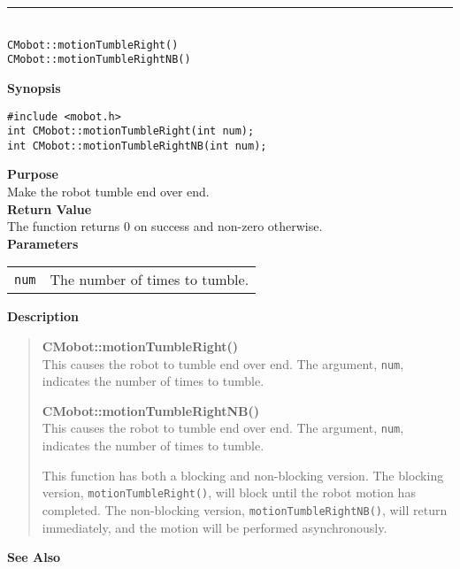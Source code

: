 \noindent
\vspace{5pt}
\rule{4.5in}{0.015in}\\
\noindent
{\LARGE \texttt{CMobot::motionTumbleRight()}}\\
{\LARGE \texttt{CMobot::motionTumbleRightNB()}}\\
{}

\noindent
{\bf Synopsis}
\vspace{-8pt}
\begin{verbatim}
#include <mobot.h>
int CMobot::motionTumbleRight(int num);
int CMobot::motionTumbleRightNB(int num);
\end{verbatim}

\noindent
{\bf Purpose}\\
Make the robot tumble end over end.\\

\noindent
{\bf Return Value}\\
The function returns 0 on success and non-zero otherwise.\\

\noindent
{\bf Parameters}\\
\vspace{-0.1in}
\begin{description}
\item               
\begin{tabular}{p{10 mm}p{145 mm}}
\texttt{num} & The number of times to tumble. \\
\end{tabular}
\end{description}

\noindent
{\bf Description}\\
\vspace{-12pt}
\begin{quote}
{\bf CMobot::motionTumbleRight()}\\
This causes the robot to tumble end over end. The argument, \texttt{num},
indicates the number of times to tumble.

{\bf CMobot::motionTumbleRightNB()}\\
This causes the robot to tumble end over end. The argument, \texttt{num},
indicates the number of times to tumble.

This function has both a blocking and non-blocking version.
The blocking version, \texttt{motionTumbleRight()}, will block until the
robot motion has completed. The non-blocking version, \texttt{motionTumbleRightNB()},
will return immediately, and the motion will be performed asynchronously.\\
\end{quote}

\noindent
{\bf See Also}\\

